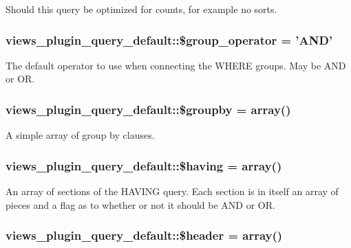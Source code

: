 \label{classviews__plugin__query__default_a2744778e8e8b20a19fcbcfebd0dd1388}
Should this query be optimized for counts, for example no sorts. \hypertarget{classviews__plugin__query__default_ab3ae3b818b07e6bcb4e28b341fb33ae4}{
\subsubsection[{\$group\_\-operator}]{\setlength{\rightskip}{0pt plus 5cm}views\_\-plugin\_\-query\_\-default::\$group\_\-operator = 'AND'}}
\label{classviews__plugin__query__default_ab3ae3b818b07e6bcb4e28b341fb33ae4}
The default operator to use when connecting the WHERE groups. May be AND or OR. \hypertarget{classviews__plugin__query__default_a0a7d6a19164e163f2aa6d7ada81f1e89}{
\subsubsection[{\$groupby}]{\setlength{\rightskip}{0pt plus 5cm}views\_\-plugin\_\-query\_\-default::\$groupby = array()}}
\label{classviews__plugin__query__default_a0a7d6a19164e163f2aa6d7ada81f1e89}
A simple array of group by clauses. \hypertarget{classviews__plugin__query__default_a93e745553fd52e27f1f8a452ac488386}{
\subsubsection[{\$having}]{\setlength{\rightskip}{0pt plus 5cm}views\_\-plugin\_\-query\_\-default::\$having = array()}}
\label{classviews__plugin__query__default_a93e745553fd52e27f1f8a452ac488386}
An array of sections of the HAVING query. Each section is in itself an array of pieces and a flag as to whether or not it should be AND or OR. \hypertarget{classviews__plugin__query__default_ac3fc642ec03905693aefc021f5550052}{
\subsubsection[{\$header}]{\setlength{\rightskip}{0pt plus 5cm}views\_\-plugin\_\-query\_\-default::\$header = array()}}
